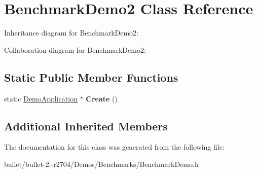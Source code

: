 \hypertarget{class_benchmark_demo2}{\section{Benchmark\+Demo2 Class Reference}
\label{class_benchmark_demo2}
}


Inheritance diagram for Benchmark\+Demo2\+:


Collaboration diagram for Benchmark\+Demo2\+:
\subsection*{Static Public Member Functions}
\begin{DoxyCompactItemize}
\item 
\hypertarget{class_benchmark_demo2_a26ecc14f537253a318ad86cc32dd36dd}{static \hyperlink{class_demo_application}{Demo\+Application} $\ast$ {\bfseries Create} ()}\label{class_benchmark_demo2_a26ecc14f537253a318ad86cc32dd36dd}

\end{DoxyCompactItemize}
\subsection*{Additional Inherited Members}


The documentation for this class was generated from the following file\+:\begin{DoxyCompactItemize}
\item 
bullet/bullet-\/2.-\/r2704/\+Demos/\+Benchmarks/Benchmark\+Demo.\+h\end{DoxyCompactItemize}
